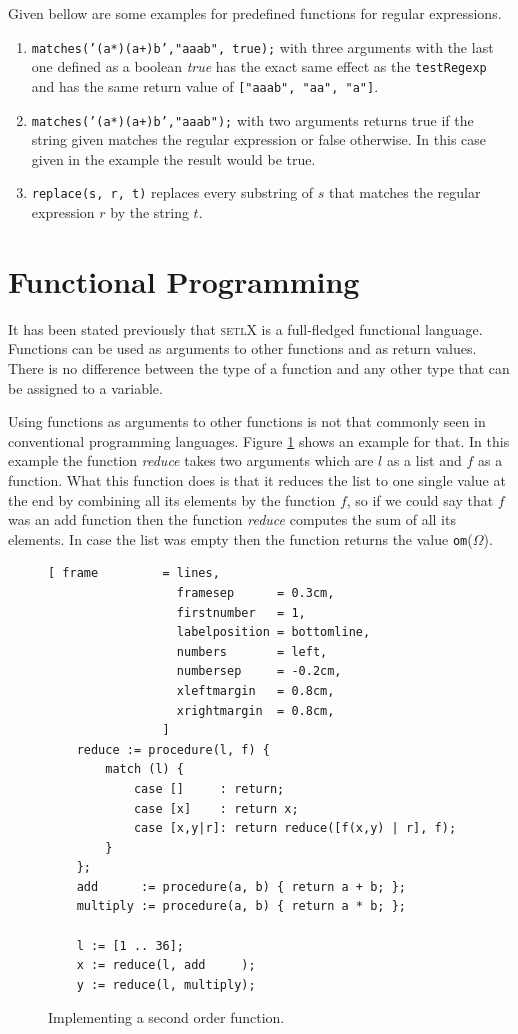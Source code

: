 \documentclass[11pt]{report}
\begin{document}
Given bellow are some examples for predefined functions for regular expressions.
\begin{enumerate}
\item \texttt{matches('(a*)(a+)b',"aaab", true);} with three arguments with the last one defined as a boolean \textsl{true} has the exact same effect as the \texttt{testRegexp} and has the same return value of \texttt{["aaab", "aa", "a"]}.
\item \texttt{matches('(a*)(a+)b',"aaab");} with two arguments returns true if the string given matches the regular expression or false otherwise. In this case given in the example the result would be true.
\item \texttt{replace(s, r, t)} replaces every substring of $s$ that matches the regular expression $r$ by the string $t$.
\end{enumerate}


\section{Functional Programming}
It has been stated previously that \textsc{setlX} is a full-fledged functional language. Functions can be used as arguments to other functions and as return values. There is no difference between the type of a function and any other type that can be assigned to a variable.

Using functions as arguments to other functions is not that commonly seen in conventional programming languages. Figure \ref{fig:reduce.stlx} shows an example for that. In this example the function \textsl{reduce} takes two arguments which are $l$ as a list and $f$ as a function. What this function does is that it reduces the list to one single value at the end by combining all its elements by the function $f$, so if we could say that $f$ was an add function then the function \textsl{reduce} computes the sum of all its elements. In case the list was empty then the function returns the value \texttt{om}($\Omega$).

\begin{figure}[!ht]
\centering
\begin{Verbatim}[ frame         = lines, 
                  framesep      = 0.3cm, 
                  firstnumber   = 1,
                  labelposition = bottomline,
                  numbers       = left,
                  numbersep     = -0.2cm,
                  xleftmargin   = 0.8cm,
                  xrightmargin  = 0.8cm,
                ]
    reduce := procedure(l, f) {
        match (l) {
            case []     : return;
            case [x]    : return x;
            case [x,y|r]: return reduce([f(x,y) | r], f);
        }    
    };
    add      := procedure(a, b) { return a + b; };
    multiply := procedure(a, b) { return a * b; };
    
    l := [1 .. 36];
    x := reduce(l, add     );
    y := reduce(l, multiply);
\end{Verbatim}
\vspace*{-0.3cm}
\caption{Implementing a second order function.}
\label{fig:reduce.stlx}
\end{figure}
\end{document}
